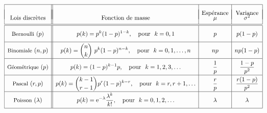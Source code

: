 \documentclass[12pt,french]{article}
\begin{document}
\begin{displaymath}
\hspace*{-0.1cm}
{\renewcommand{\arraystretch}{2}
\begin{array}{|c||c|c|c|}
\hline
 & & \mbox{Espérance} & \mbox{Variance}\\[-16pt]
\mbox{Lois discrètes}& \mbox{Fonction de masse}& \mu & \sigma^2 \\
\hline
\hline
\mbox{\small Bernoulli}~(p) & \displaystyle
p(k)=p^k(1-p)^{1-k},~~~\mbox{pour}~~k=0,1 &
\displaystyle p & \displaystyle p(1-p) \\[.10cm]
\hline
\mbox{\small Binomiale}~(n,p)& \displaystyle
p(k)={n \choose k}~p^{k}(1-p)^{n-k},~~~\mbox{pour}~~k=0,1,\ldots,n&
\displaystyle np& \displaystyle np(1-p)\\[.10cm]
\hline
\mbox{\small Géométrique}~(p)&\displaystyle
p(k)=(1-p)^{k-1}p,~~~\mbox{pour}~~k=1,2,3,\ldots& \displaystyle
\frac{1}{p}& \displaystyle \frac{1-p}{p^{2}}\\[.10cm]
\hline
\mbox{\small Pascal}~(r,p)&\displaystyle
p(k)={k-1 \choose r-1}p^r(1-p)^{k-r},~~~\mbox{pour}~~k=r,r+1,\ldots& \displaystyle
\frac{r}{p}& \displaystyle \frac{r(1-p)}{p^{2}}\\[.10cm]
\hline
\mbox{\small Poisson}~(\lambda)&\displaystyle
p(k)=\mbox{e}^{-\lambda}\frac{\lambda^k}{k!},~~~\mbox{pour}~~k=0,1,2,\ldots& \displaystyle
\lambda & \displaystyle \lambda \\[.10cm]
\hline
\multicolumn{4}{c}{}  \\[-0.8 cm]
%
%


\end{array}}
\end{displaymath}
\end{document}
